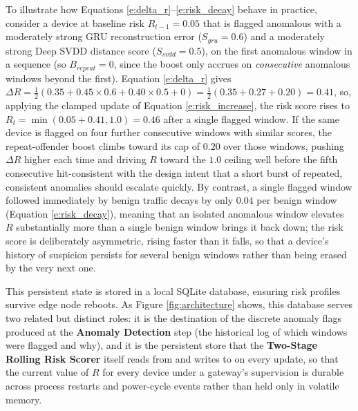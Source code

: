 To illustrate how Equations \ref{e:delta_r}--\ref{e:risk_decay} behave in practice, consider a device at baseline risk $R_{t-1} = 0.05$ that is flagged anomalous with a moderately strong GRU reconstruction error ($S_{gru} = 0.6$) and a moderately strong Deep SVDD distance score ($S_{svdd} = 0.5$), on the first anomalous window in a sequence (so $B_{repeat} = 0$, since the boost only accrues on \emph{consecutive} anomalous windows beyond the first). Equation \ref{e:delta_r} gives $\Delta R = \frac{1}{2}(0.35 + 0.45 \times 0.6 + 0.40 \times 0.5 + 0) = \frac{1}{2}(0.35 + 0.27 + 0.20) = 0.41$, so, applying the clamped update of Equation \ref{e:risk_increase}, the risk score rises to $R_t = \min(0.05 + 0.41, 1.0) = 0.46$ after a single flagged window. If the same device is flagged on four further consecutive windows with similar scores, the repeat-offender boost climbs toward its cap of $0.20$ over those windows, pushing $\Delta R$ higher each time and driving $R$ toward the $1.0$ ceiling well before the fifth consecutive hit-consistent with the design intent that a short burst of repeated, consistent anomalies should escalate quickly. By contrast, a single flagged window followed immediately by benign traffic decays by only $0.04$ per benign window (Equation \ref{e:risk_decay}), meaning that an isolated anomalous window elevates $R$ substantially more than a single benign window brings it back down; the risk score is deliberately asymmetric, rising faster than it falls, so that a device's history of suspicion persists for several benign windows rather than being erased by the very next one.

This persistent state is stored in a local SQLite database, ensuring risk profiles survive edge node reboots. As Figure \ref{fig:architecture} shows, this database serves two related but distinct roles: it is the destination of the discrete anomaly flags produced at the \textbf{Anomaly Detection} step (the historical log of which windows were flagged and why), and it is the persistent store that the \textbf{Two-Stage Rolling Risk Scorer} itself reads from and writes to on every update, so that the current value of $R$ for every device under a gateway's supervision is durable across process restarts and power-cycle events rather than held only in volatile memory.

